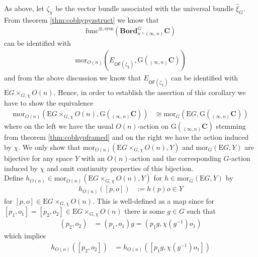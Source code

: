 \begin{prf}[Sketch]
As above, let $\zeta_{\chi}$ be the vector bundle associated with the universal bundle $\hat{\xi}_{G}$. From theorem \ref{thm:cobhypyzstruct} we know that
\begin{align*}
  \mathrm{func}^{\otimes,\mathrm{sym}}
  \left(
    \mathbf{Bord}_{n}^{G}
    ,
    {_{(\infty,n)}}\mathbf{C}
  \right)
\end{align*}
can be identified with
\begin{align*}
  \mathrm{mor}_{O(n)}
  \left(
    E_{\mathsf{OF}(\zeta_{\chi})}
    ,
    \mathrm{G}({_{(\infty,n)}}\mathbf{C})
  \right)
\end{align*}
and from the above discussion we know that $E_{\mathsf{OF}(\zeta_{\chi})}$ can be identified with $\mathrm{E}G \times_{G,\chi} O(n)$. Hence, in order to establish the assertion of this corollary we have to show the equivalence
\begin{align*}
  \mathrm{mor}_{O(n)}
  \left(
    \mathrm{E}G
    \times_{G,\chi}
    O(n)
    ,
    \mathrm{G}({_{(\infty,n)}}\mathbf{C})
  \right)
  &\cong
  \mathrm{mor}_{G}
  \left(
    \mathrm{E}G
    ,
    \mathrm{G}({_{(\infty,n)}}\mathbf{C})
  \right)
\end{align*}
where on the left we have the usual $O(n)$-action on $\mathrm{G}({_{(\infty,n)}}\mathbf{C})$ stemming from theorem \ref{thm:cobhypframed} and on the right we have the action induced by $\chi$. We only show that $\mathrm{mor}_{O(n)}(\mathrm{E}G \times_{G,\chi} O(n),Y)$ and $\mathrm{mor}_{G}(\mathrm{E}G,Y)$ are bijective for any space $Y$ with an $O(n)$-action and the corresponding $G$-action induced by $\chi$ and omit continuity properties of this bijection.
\\
Define $h_{O(n)} \in \mathrm{mor}_{O(n)}(\mathrm{E}G \times_{G,\chi} O(n),Y)$ for $h \in \mathrm{mor}_{G}(\mathrm{E}G,Y)$ by
\begin{align*}
  h_{O(n)}([p,o])
  &:=
  h(p)
  o
  \in
  Y
\end{align*}
for $[p,o] \in \mathrm{E}G \times_{G,\chi} O(n)$. This is well-defined as a map since for $[p_{1},o_{1}] = [p_{2},o_{2}] \in \mathrm{E}G \times_{G,\chi} O(n)$ there is some $g \in G$ such that
\begin{align*}
  (p_{2},o_{2})
  &=
  (p_{1},o_{1})
  g
  =
  (p_{1}g,\chi(g^{-1})o_{1})
\end{align*}
which implies
\begin{align*}
  h_{O(n)}([p_{2},o_{2}])
  &=
  h_{O(n)}([p_{1}g,\chi(g^{-1})o_{1}])
  \\

\end{align*}
\end{prf}
